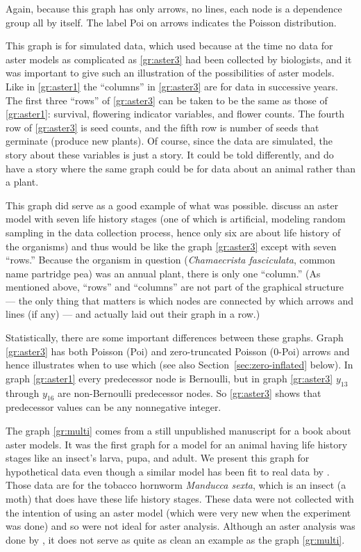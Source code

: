 Again, because this graph has only arrows, no lines, each node is
a dependence group all by itself.  The label Poi on arrows indicates
the Poisson distribution.

This graph is for simulated data, which \citet{aster3} used because
at the time no data for aster models as complicated as \eqref{gr:aster3} had
been collected by biologists, and it was important to give such
an illustration of the possibilities of aster models.
Like in \eqref{gr:aster1} the ``columns'' in \eqref{gr:aster3} are for
data in successive years.  The first three ``rows'' of \eqref{gr:aster3}
can be taken to be the same as those of \eqref{gr:aster1}: survival,
flowering indicator variables, and flower counts.  The fourth row of
\eqref{gr:aster3} is seed counts, and the fifth row is number of seeds
that germinate (produce new plants).  Of course, since the data
are simulated, the story about these variables is just a story.
It could be told differently, and \citet{aster3} do have a story
where the same graph could be for data about an animal rather than a plant.

This graph did serve as a good example of what was possible.
\citet*[in the on-line appendix]{stanton-geddes-tiffin-shaw}
discuss an aster model with seven life history stages (one of which is
artificial, modeling random sampling in the data collection process, hence
only six are about life history of the organisms) and thus would be
like the graph \eqref{gr:aster3} except with seven ``rows.''
Because the organism in question (\emph{Chamaecrista fasciculata}, common
name partridge pea) was an annual plant, there is only one ``column.''
(As mentioned above, ``rows'' and ``columns'' are not part of the graphical
structure --- the only thing that matters is which nodes are connected
by which arrows and lines (if any) ---
and \citeauthor{stanton-geddes-tiffin-shaw} actually
laid out their graph in a row.)

Statistically, there are some important differences between these graphs.
Graph \eqref{gr:aster3} has both Poisson (Poi) and zero-truncated Poisson
(0-Poi) arrows and hence illustrates when to use which
(see also Section~\ref{sec:zero-inflated} below).
In graph \eqref{gr:aster1} every predecessor node is Bernoulli,
but in graph \eqref{gr:aster3} $y_{13}$ through $y_{16}$ are non-Bernoulli
predecessor nodes.  So \eqref{gr:aster3} shows that predecessor values can
be any nonnegative integer.

The graph \eqref{gr:multi} comes from a still unpublished manuscript for a book
about aster models.  It was the first graph for a model for an animal having
life history stages like an insect's larva, pupa, and adult.  We present this
graph for hypothetical data even though a similar model has been fit to real
data by \citet{aster-hornworm}.  Those data are for the tobacco hornworm
\emph{Manducca sexta}, which is an insect (a moth) that does have these life
history stages.  These data were not collected with the intention of using
an aster model (which were very new when the experiment was done) and so were
not ideal for aster analysis.  Although an aster analysis was done by
\citet{aster-hornworm}, it does not serve as quite as clean an example as
the graph \eqref{gr:multi}.

